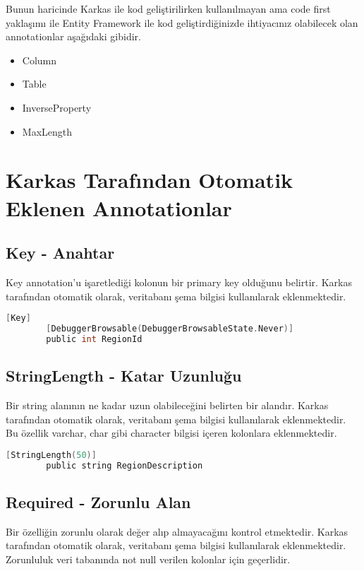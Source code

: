 \documentclass[10pt,a4paper]{article}
\begin{document}
Bunun haricinde Karkas ile kod geliştirilirken kullanılmayan
ama code first yaklaşımı ile Entity Framework ile kod
geliştirdiğinizde ihtiyacınız olabilecek olan
annotationlar aşağıdaki gibidir.


\begin{itemize}

\item  Column

\item Table

\item InverseProperty

\item  MaxLength


\end{itemize}


\section{Karkas Tarafından Otomatik Eklenen Annotationlar}

\subsection{Key - Anahtar}
Key annotation'u işaretlediği kolonun bir primary key olduğunu belirtir.
Karkas tarafından otomatik olarak, veritabanı şema bilgisi kullanılarak eklenmektedir.

\begin{lstlisting}[label=code-Key,caption=Key,language=C]
		[Key]
		[DebuggerBrowsable(DebuggerBrowsableState.Never)]
		public int RegionId
\end{lstlisting}


\subsection{StringLength - Katar Uzunluğu}
Bir string alanının ne kadar uzun olabileceğini belirten bir alandır.
Karkas tarafından otomatik olarak, veritabanı şema bilgisi kullanılarak eklenmektedir.
Bu özellik varchar, char gibi character bilgisi içeren kolonlara eklenmektedir.

\begin{lstlisting}[label=code-StringLength,caption=StringLength,language=C]
		[StringLength(50)]
		public string RegionDescription
\end{lstlisting}



\subsection{Required - Zorunlu Alan}
Bir özelliğin zorunlu olarak değer alıp almayacağını kontrol etmektedir.
Karkas tarafından otomatik olarak, veritabanı şema bilgisi kullanılarak eklenmektedir.
Zorunluluk veri tabanında not null verilen kolonlar için geçerlidir.
\end{document}
